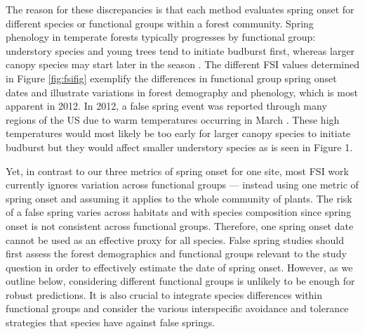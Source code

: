 \documentclass{article}\usepackage[]{graphicx}\usepackage[]{color}
\begin{document}
The reason for these discrepancies is that each method evaluates spring onset for different species or functional groups within a forest community. Spring phenology in temperate forests typically progresses by functional group: understory species and young trees tend to initiate budburst first, whereas larger canopy species may start later in the season \citep{Richardson2009, Xin2016}. The different FSI values determined in Figure \ref{fig:fsifig} exemplify the differences in functional group spring onset dates and illustrate variations in forest demography and phenology, which is most apparent in 2012. In 2012, a false spring event was reported through many regions of the US due to warm temperatures occurring in March \citep{Ault2015}. These high temperatures would most likely be too early for larger canopy species to initiate budburst but they would affect smaller understory species as is seen in Figure 1. 

Yet, in contrast to our three metrics of spring onset for one site, most FSI work currently ignores variation across functional groups --- instead using one metric of spring onset and assuming it applies to the whole community of plants. The risk of a false spring varies across habitats and with species composition since spring onset is not consistent across functional groups. Therefore, one spring onset date cannot be used as an effective proxy for all species. False spring studies should first assess the forest demographics and functional groups relevant to the study question in order to effectively estimate the date of spring onset. However, as we outline below, considering different functional groups is unlikely to be enough for robust predictions. It is also crucial to integrate species differences within functional groups and consider the various interspecific avoidance and tolerance strategies that species have against false springs. %
\end{document}
